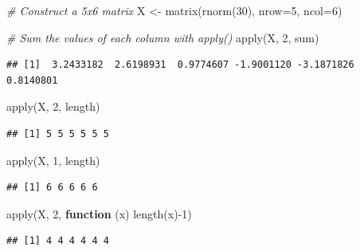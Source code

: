 \documentclass[
]{book}
\newenvironment{Shaded}{\begin{snugshade}}{\end{snugshade}}
\newcommand{\AttributeTok}[1]{\textcolor[rgb]{0.77,0.63,0.00}{#1}}
\newcommand{\CommentTok}[1]{\textcolor[rgb]{0.56,0.35,0.01}{\textit{#1}}}
\newcommand{\ControlFlowTok}[1]{\textcolor[rgb]{0.13,0.29,0.53}{\textbf{#1}}}
\newcommand{\DecValTok}[1]{\textcolor[rgb]{0.00,0.00,0.81}{#1}}
\newcommand{\FunctionTok}[1]{\textcolor[rgb]{0.00,0.00,0.00}{#1}}
\newcommand{\NormalTok}[1]{#1}
\newcommand{\OtherTok}[1]{\textcolor[rgb]{0.56,0.35,0.01}{#1}}
\newcommand{\SpecialCharTok}[1]{\textcolor[rgb]{0.00,0.00,0.00}{#1}}
\begin{document}
\begin{Shaded}
\begin{Highlighting}[]
\CommentTok{\# Construct a 5x6 matrix}
\NormalTok{X }\OtherTok{\textless{}{-}} \FunctionTok{matrix}\NormalTok{(}\FunctionTok{rnorm}\NormalTok{(}\DecValTok{30}\NormalTok{), }\AttributeTok{nrow=}\DecValTok{5}\NormalTok{, }\AttributeTok{ncol=}\DecValTok{6}\NormalTok{)}

\CommentTok{\# Sum the values of each column with \textasciigrave{}apply()\textasciigrave{}}
\FunctionTok{apply}\NormalTok{(X, }\DecValTok{2}\NormalTok{, sum)}
\end{Highlighting}
\end{Shaded}

\begin{verbatim}
## [1]  3.2433182  2.6198931  0.9774607 -1.9001120 -3.1871826  0.8140801
\end{verbatim}

\begin{Shaded}
\begin{Highlighting}[]
\FunctionTok{apply}\NormalTok{(X, }\DecValTok{2}\NormalTok{, length)}
\end{Highlighting}
\end{Shaded}

\begin{verbatim}
## [1] 5 5 5 5 5 5
\end{verbatim}

\begin{Shaded}
\begin{Highlighting}[]
\FunctionTok{apply}\NormalTok{(X, }\DecValTok{1}\NormalTok{, length)}
\end{Highlighting}
\end{Shaded}

\begin{verbatim}
## [1] 6 6 6 6 6
\end{verbatim}

\begin{Shaded}
\begin{Highlighting}[]
\FunctionTok{apply}\NormalTok{(X, }\DecValTok{2}\NormalTok{, }\ControlFlowTok{function}\NormalTok{ (x) }\FunctionTok{length}\NormalTok{(x)}\SpecialCharTok{{-}}\DecValTok{1}\NormalTok{)}
\end{Highlighting}
\end{Shaded}

\begin{verbatim}
## [1] 4 4 4 4 4 4
\end{verbatim}
\end{document}
